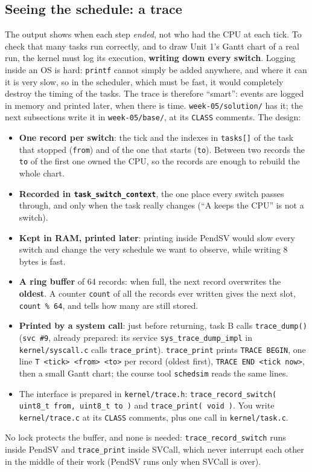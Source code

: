 \subsection{Seeing the schedule: a trace}
The output shows when each step \emph{ended}, not who had the CPU at each tick. To check that many tasks run correctly, and to draw Unit 1's Gantt chart of a real run, the kernel must log its execution, \textbf{writing down every switch}. Logging inside an OS is hard: \texttt{printf} cannot simply be added anywhere, and where it can it is very slow, so in the scheduler, which must be fast, it would completely destroy the timing of the tasks. The trace is therefore ``smart'': events are logged in memory and printed later, when there is time. \texttt{week-05/solution/} has it; the next subsections write it in \texttt{week-05/base/}, at its \texttt{CLASS} comments. The design:
\begin{itemize}
    \item \textbf{One record per switch}: the tick and the indexes in \texttt{tasks[]} of the task that stopped (\texttt{from}) and of the one that starts (\texttt{to}). Between two records the \texttt{to} of the first one owned the CPU, so the records are enough to rebuild the whole chart.
    \item \textbf{Recorded in \texttt{task\_switch\_context}}, the one place every switch passes through, and only when the task really changes (``A keeps the CPU'' is not a switch).
    \item \textbf{Kept in RAM, printed later}: printing inside PendSV would slow every switch and change the very schedule we want to observe, while writing 8 bytes is fast.
    \item \textbf{A ring buffer} of 64 records: when full, the next record overwrites the \textbf{oldest}. A counter \texttt{count} of all the records ever written gives the next slot, \texttt{count \% 64}, and tells how many are still stored.
    \item \textbf{Printed by a system call}: just before returning, task B calls \texttt{trace\_dump()} (\texttt{svc \#9}, already prepared: its service \texttt{sys\_trace\_dump\_impl} in \texttt{kernel/syscall.c} calls \texttt{trace\_print}). \texttt{trace\_print} prints \texttt{TRACE BEGIN}, one line \texttt{T <tick> <from> <to>} per record (oldest first), \texttt{TRACE END <tick now>}, then a small Gantt chart; the course tool \texttt{schedsim} reads the same lines.
    \item The interface is prepared in \texttt{kernel/trace.h}: \texttt{trace\_record\_switch( uint8\_t from, uint8\_t to )} and \texttt{trace\_print( void )}. You write \texttt{kernel/trace.c} at its \texttt{CLASS} comments, plus one call in \texttt{kernel/task.c}.
\end{itemize}
No lock protects the buffer, and none is needed: \texttt{trace\_record\_switch} runs inside PendSV and \texttt{trace\_print} inside SVCall, which never interrupt each other in the middle of their work (PendSV runs only when SVCall is over).

